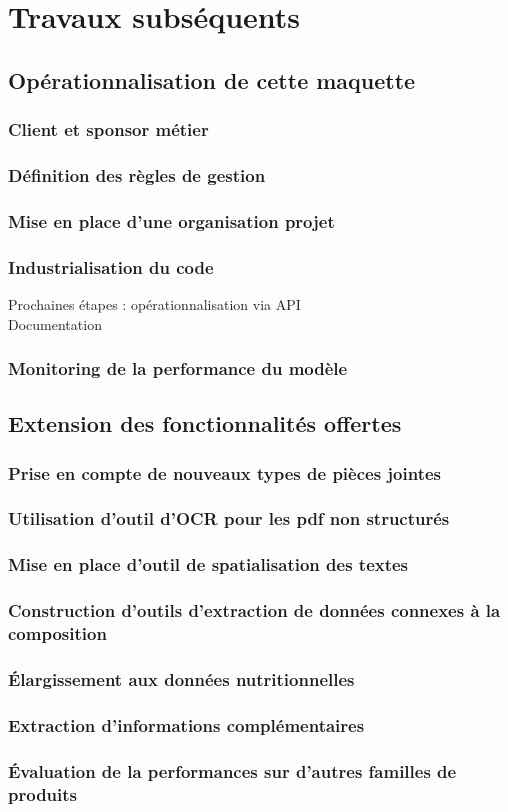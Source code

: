 \part{Travaux subséquents}
    \chapter{Opérationnalisation de cette maquette}    
        \section{Client et sponsor métier}
        \section{Définition des règles de gestion}
        \section{Mise en place d'une organisation projet}
        \section{Industrialisation du code}
        Prochaines étapes : opérationnalisation via API \\
        Documentation
        \section{Monitoring de la performance du modèle}
    \chapter{Extension des fonctionnalités offertes}
        \section{Prise en compte de nouveaux types de pièces jointes}
        \section{Utilisation d'outil d'OCR pour les pdf non structurés}
        \section{Mise en place d'outil de spatialisation des textes}
        \section{Construction d'outils d'extraction de données connexes à la composition}
        \section{\'{E}largissement aux données nutritionnelles}
        \section{Extraction d'informations complémentaires}
        \section{\'{E}valuation de la performances sur d'autres familles de produits}